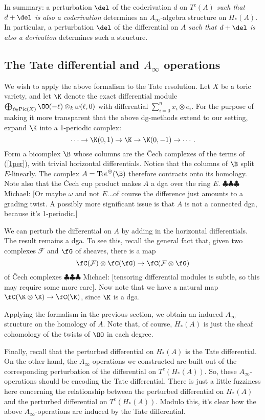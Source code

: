 \documentclass[12pt]{amsart}
\theoremstyle{definition}
\theoremstyle{remark}
\newcommand{\Pic}{\operatorname{Pic}}
\newcommand{\F}{\FF}
\newcommand{\michael}[1]{{\color{red} \sf $\clubsuit\clubsuit\clubsuit$ Michael: [#1]}}
\def\on{\operatorname}
\def\F{\mathcal{F}}
\def\o{\omega}
\def\l{\ell}
\begin{document}
In summary: a perturbation $\del$ of the coderivation $d$ on $T^c(A)$ \emph{such that $d + \del$ is also a coderivation} determines an $A_\infty$-algebra structure on $H_*(A)$. In particular, a perturbation $\del$ of the differential on $A$ \emph{such that $d + \del$ is also a derivation} determines such a structure.


\subsection{The Tate differential and $A_\infty$ operations}
We wish to apply the above formalism to the Tate resolution.
Let $X$ be a toric variety, and let $\K$ denote the exact differential module $\bigoplus_{\l \in \Pic(X)} \OO(-\l) \otimes_k \o(\l, 0)$ with differential $\sum_{i = 0}^n x_i \otimes e_i$. For the purpose of making it more transparent that the above dg-methods extend to our setting, expand $\K$ into a 1-periodic complex:
\begin{equation}
\label{1per}
\cdots \to \K(0, 1) \to \K \to \K(0, -1)  \to \cdots.
\end{equation}
Form a bicomplex $\B$ whose columns are the \v{C}ech complexes of the terms of (\ref{1per}), with trivial horizontal differentials. Notice that the columns of $\B$ split $E$-linearly. The complex $A = \on{Tot}^{\oplus}(\B)$ therefore contracts onto its homology. Note also that the \v{C}ech cup product makes $A$ a dga over the ring $E$. \michael{Or maybe $\o$ and not $E$...of course the difference just amounts to a grading twist. A possibly more significant issue is that $A$ is not a connected dga, because it's 1-periodic.}

We can perturb the differential on $A$ by adding in the horizontal differentials. The result remains a dga. To see this, recall the general fact that, given two complexes $\F$ and $\fG$ of sheaves, there is a map
$$
\fC(\F) \otimes \fC(\fG) \to \fC(\F \otimes \fG)
$$
of \v{C}ech complexes \michael{tensoring differential modules is subtle, so this may require some more care}. Now note that we have a natural map $\fC(\K \otimes \K) \to \fC(\K)$, since $\K$ is a dga. 

Applying the formalism in the previous section, we obtain an induced $A_\infty$-structure on the homology of $A$. Note that, of course, $H_*(A)$  is just the sheaf cohomology of the twists of $\OO$ in each degree. 

Finally, recall that the perturbed differential on $H_*(A)$ is the Tate differential. On the other hand, the $A_\infty$-operations we constructed are built out of the corresponding perturbation of the differential on $T^c(H_*(A))$. So, these $A_\infty$-operations should be encoding the Tate differential. There is just a little fuzziness here concerning the relationship between the perturbed differential on $H_*(A)$ and the perturbed differential on $T^c(H_*(A))$. Modulo  this, it's clear how the above $A_\infty$-operations are induced by the Tate differential.
\end{document}
